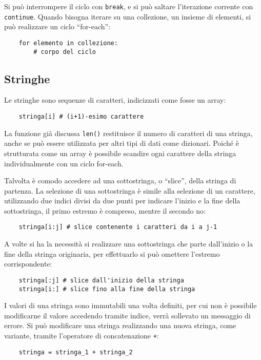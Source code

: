 \documentclass{article}
\numberwithin{equation}{subsection}
\begin{document}
Si può interrompere il ciclo con \verb|break|, e si può saltare l'iterazione corrente con \verb|continue|. Quando bisogna iterare su una collezione, un insieme di elementi, 
si può realizzare un ciclo ``for-each'': 
\begin{verbatim}
    for elemento in collezione: 
        # corpo del ciclo
\end{verbatim}

\subsection{Stringhe}

Le stringhe sono sequenze di caratteri, indicizzati come fosse un array:
\begin{verbatim}
    stringa[i] # (i+1)-esimo carattere
\end{verbatim}
La funzione già discussa \verb|len()| restituisce il numero di caratteri di una stringa, 
anche se può essere utilizzata per altri tipi di dati come dizionari. Poiché è strutturata come un array è possibile scandire ogni carattere della stringa individualmente 
con un ciclo for-each. 

Talvolta è comodo accedere ad una sottostringa, o ``slice'', della stringa di partenza. La selezione di una sottostringa è simile alla selezione di un carattere, 
utilizzando due indici divisi da due punti per indicare l'inizio e la fine della sottostringa, il primo estremo è compreso, mentre il secondo no:
\begin{verbatim}
    stringa[i:j] # slice contenente i caratteri da i a j-1
\end{verbatim}

A volte si ha la necessità si realizzare una sottostringa che parte dall'inizio o la fine della stringa originaria, per effettuarlo si può omettere l'estremo 
corrispondente:
\begin{verbatim}
    stringa[:j] # slice dall'inizio della stringa
    stringa[i:] # slice fino alla fine della stringa
\end{verbatim}

I valori di una stringa sono immutabili una volta definiti, per cui non è possibile modificarne il valore accedendo tramite indice, verrà sollevato un messaggio di errore. 
Si può modificare una stringa realizzando una nuova stringa, come variante, tramite l'operatore di concatenazione \verb|+|:
\begin{verbatim}
    stringa = stringa_1 + stringa_2 
\end{verbatim}
\end{document}
